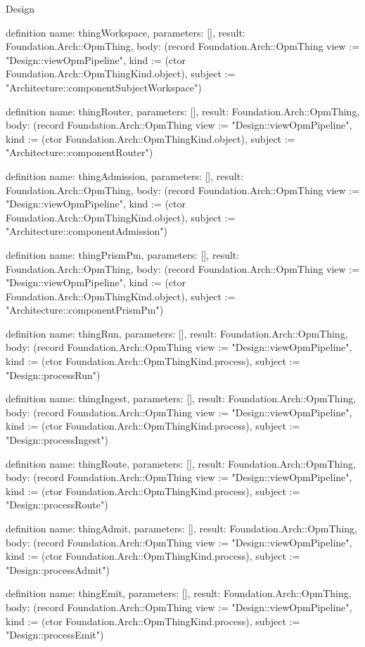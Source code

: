 \begin{lexlean}{Design}
\begin{semanticmodule}
definition{
  name: thingWorkspace,
  parameters: [],
  result: Foundation.Arch::OpmThing,
  body: (record Foundation.Arch::OpmThing {view := "Design::viewOpmPipeline", kind := (ctor Foundation.Arch::OpmThingKind.object), subject := "Architecture::componentSubjectWorkspace"})
}

definition{
  name: thingRouter,
  parameters: [],
  result: Foundation.Arch::OpmThing,
  body: (record Foundation.Arch::OpmThing {view := "Design::viewOpmPipeline", kind := (ctor Foundation.Arch::OpmThingKind.object), subject := "Architecture::componentRouter"})
}

definition{
  name: thingAdmission,
  parameters: [],
  result: Foundation.Arch::OpmThing,
  body: (record Foundation.Arch::OpmThing {view := "Design::viewOpmPipeline", kind := (ctor Foundation.Arch::OpmThingKind.object), subject := "Architecture::componentAdmission"})
}

definition{
  name: thingPrismPm,
  parameters: [],
  result: Foundation.Arch::OpmThing,
  body: (record Foundation.Arch::OpmThing {view := "Design::viewOpmPipeline", kind := (ctor Foundation.Arch::OpmThingKind.object), subject := "Architecture::componentPrismPm"})
}

definition{
  name: thingRun,
  parameters: [],
  result: Foundation.Arch::OpmThing,
  body: (record Foundation.Arch::OpmThing {view := "Design::viewOpmPipeline", kind := (ctor Foundation.Arch::OpmThingKind.process), subject := "Design::processRun"})
}

definition{
  name: thingIngest,
  parameters: [],
  result: Foundation.Arch::OpmThing,
  body: (record Foundation.Arch::OpmThing {view := "Design::viewOpmPipeline", kind := (ctor Foundation.Arch::OpmThingKind.process), subject := "Design::processIngest"})
}

definition{
  name: thingRoute,
  parameters: [],
  result: Foundation.Arch::OpmThing,
  body: (record Foundation.Arch::OpmThing {view := "Design::viewOpmPipeline", kind := (ctor Foundation.Arch::OpmThingKind.process), subject := "Design::processRoute"})
}

definition{
  name: thingAdmit,
  parameters: [],
  result: Foundation.Arch::OpmThing,
  body: (record Foundation.Arch::OpmThing {view := "Design::viewOpmPipeline", kind := (ctor Foundation.Arch::OpmThingKind.process), subject := "Design::processAdmit"})
}

definition{
  name: thingEmit,
  parameters: [],
  result: Foundation.Arch::OpmThing,
  body: (record Foundation.Arch::OpmThing {view := "Design::viewOpmPipeline", kind := (ctor Foundation.Arch::OpmThingKind.process), subject := "Design::processEmit"})
}


\end{semanticmodule}
\end{lexlean}
